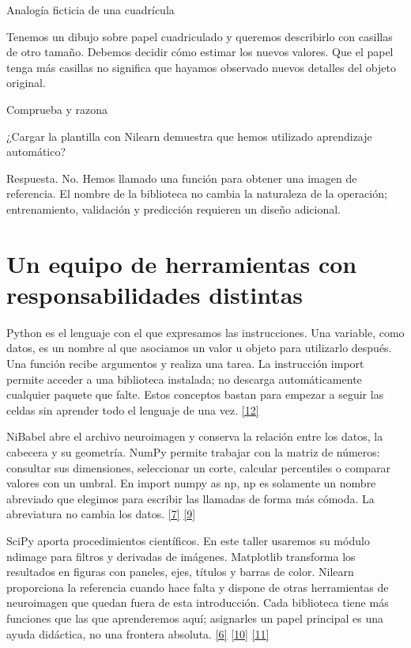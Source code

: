 
\begin{Idea}{Analogía ficticia de una cuadrícula}

Tenemos un dibujo sobre papel cuadriculado y queremos describirlo con casillas de otro tamaño. Debemos decidir cómo estimar los nuevos valores. Que el papel tenga más casillas no significa que hayamos observado nuevos detalles del objeto original.


\end{Idea}


\begin{Practica}{Comprueba y razona}

¿Cargar la plantilla con Nilearn demuestra que hemos utilizado aprendizaje automático?


Respuesta. No. Hemos llamado una función para obtener una imagen de referencia. El nombre de la biblioteca no cambia la naturaleza de la operación; entrenamiento, validación y predicción requieren un diseño adicional.


\end{Practica}

\section{Un equipo de herramientas con responsabilidades distintas}

Python es el lenguaje con el que expresamos las instrucciones. Una variable, como datos, es un nombre al que asociamos un valor u objeto para utilizarlo después. Una función recibe argumentos y realiza una tarea. La instrucción import permite acceder a una biblioteca instalada; no descarga automáticamente cualquier paquete que falte. Estos conceptos bastan para empezar a seguir las celdas sin aprender todo el lenguaje de una vez. \hyperlink{refR12}{[12]}


NiBabel abre el archivo neuroimagen y conserva la relación entre los datos, la cabecera y su geometría. NumPy permite trabajar con la matriz de números: consultar sus dimensiones, seleccionar un corte, calcular percentiles o comparar valores con un umbral. En import numpy as np, np es solamente un nombre abreviado que elegimos para escribir las llamadas de forma más cómoda. La abreviatura no cambia los datos. \hyperlink{refR7}{[7]} \hyperlink{refR9}{[9]}


SciPy aporta procedimientos científicos. En este taller usaremos su módulo ndimage para filtros y derivadas de imágenes. Matplotlib transforma los resultados en figuras con paneles, ejes, títulos y barras de color. Nilearn proporciona la referencia cuando hace falta y dispone de otras herramientas de neuroimagen que quedan fuera de esta introducción. Cada biblioteca tiene más funciones que las que aprenderemos aquí; asignarles un papel principal es una ayuda didáctica, no una frontera absoluta. \hyperlink{refR6}{[6]} \hyperlink{refR10}{[10]} \hyperlink{refR11}{[11]}


